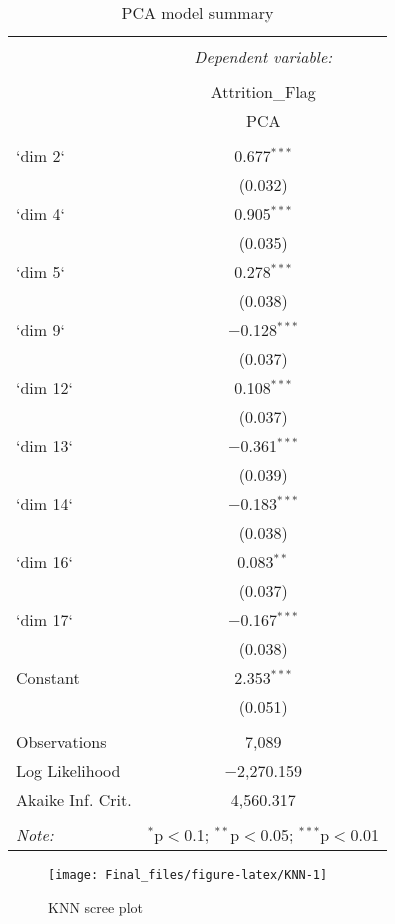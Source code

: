\begin{table}[!htbp] \centering 
  \caption{PCA model summary} 
  \label{tab:PCAM} 
\begin{tabular}{@{\extracolsep{5pt}}lc} 
\\[-1.8ex]\hline 
\hline \\[-1.8ex] 
 & \multicolumn{1}{c}{\textit{Dependent variable:}} \\ 
\cline{2-2} 
\\[-1.8ex] & Attrition\_Flag \\ 
 & PCA \\ 
\hline \\[-1.8ex] 
 `dim 2` & 0.677$^{***}$ \\ 
  & (0.032) \\ 
  `dim 4` & 0.905$^{***}$ \\ 
  & (0.035) \\ 
  `dim 5` & 0.278$^{***}$ \\ 
  & (0.038) \\ 
  `dim 9` & $-$0.128$^{***}$ \\ 
  & (0.037) \\ 
  `dim 12` & 0.108$^{***}$ \\ 
  & (0.037) \\ 
  `dim 13` & $-$0.361$^{***}$ \\ 
  & (0.039) \\ 
  `dim 14` & $-$0.183$^{***}$ \\ 
  & (0.038) \\ 
  `dim 16` & 0.083$^{**}$ \\ 
  & (0.037) \\ 
  `dim 17` & $-$0.167$^{***}$ \\ 
  & (0.038) \\ 
  Constant & 2.353$^{***}$ \\ 
  & (0.051) \\ 
 \hline \\[-1.8ex] 
Observations & 7,089 \\ 
Log Likelihood & $-$2,270.159 \\ 
Akaike Inf. Crit. & 4,560.317 \\ 
\hline 
\hline \\[-1.8ex] 
\textit{Note:}  & \multicolumn{1}{r}{$^{*}$p$<$0.1; $^{**}$p$<$0.05; $^{***}$p$<$0.01} \\ 
\end{tabular} 
\end{table}

\begin{Schunk}
\begin{figure}

{\centering \texttt{[image: Final\_files/figure-latex/KNN-1]} 

}

\caption[KNN scree plot]{KNN scree plot}\label{fig:KNN}
\end{figure}
\end{Schunk}

